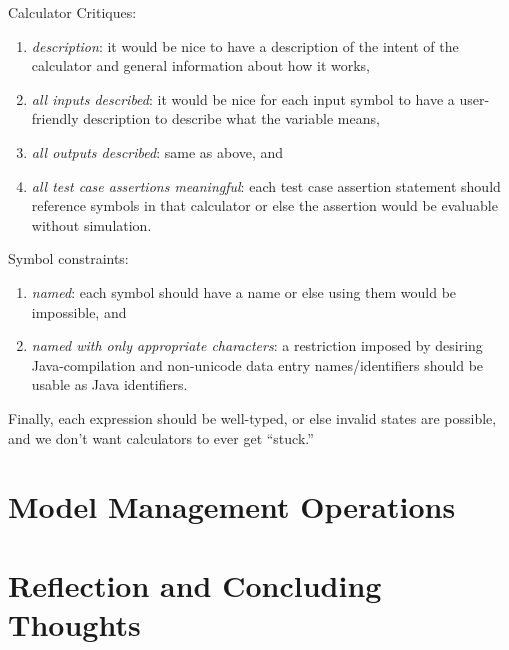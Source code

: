 \documentclass[11pt,fleqn]{article}
\begin{document}
\noindent{}Calculator Critiques:
\begin{enumerate}
  \item \textit{description}: it would be nice to have a description of the
        intent of the calculator and general information about how it works,
  \item \textit{all inputs described}: it would be nice for each input symbol to
        have a user-friendly description to describe what the variable means,
  \item \textit{all outputs described}: same as above, and
  \item \textit{all test case assertions meaningful}: each test case assertion
        statement should reference symbols in that calculator or else the
        assertion would be evaluable without simulation.
\end{enumerate}

\noindent{}Symbol constraints:
\begin{enumerate}
  \item \textit{named}: each symbol should have a name or else using them would
        be impossible, and
  \item \textit{named with only appropriate characters}: a restriction imposed
        by desiring Java-compilation and non-unicode data entry \textemdash{}
        names/identifiers should be usable as Java identifiers.
\end{enumerate}

Finally, each expression should be well-typed, or else invalid states are
possible, and we don't want calculators to ever get ``stuck.''

\newpage{}

\section{Model Management Operations}
\label{sec:model-management-operations}

\newpage{}

\section{Reflection and Concluding Thoughts}
\label{sec:reflection-and-concluding-thoughts}
\end{document}
